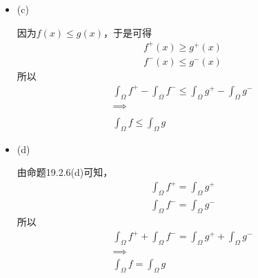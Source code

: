 \documentclass{article}
\begin{document}
\begin{itemize}
  \item (c)

        因为$f(x) \leq g(x)$，于是可得
        \begin{align*}
          f^+(x) \geq g^+(x) \\
          f^-(x) \leq g^-(x)
        \end{align*}
        所以
        \begin{align*}
          \int_{\Omega} f^+ - \int_{\Omega} f^- \leq \int_{\Omega} g^+ - \int_{\Omega} g^- \\
          \implies                                                                         \\                                                                        \\
          \int_{\Omega} f \leq \int_{\Omega} g
        \end{align*}

  \item (d)

        由命题19.2.6(d)可知，
        \begin{align*}
          \int_{\Omega} f^+ = \int_{\Omega} g^+ \\
          \int_{\Omega} f^- = \int_{\Omega} g^-
        \end{align*}
        所以
        \begin{align*}
          \int_{\Omega} f^+  + \int_{\Omega} f^- = \int_{\Omega} g^+ + \int_{\Omega} g^- \\
          \implies                                                                       \\
          \int_{\Omega} f = \int_{\Omega} g
        \end{align*}

\end{itemize}
\end{document}
